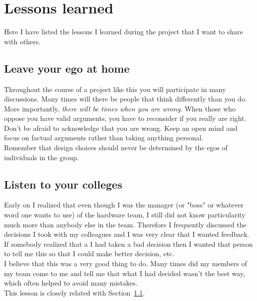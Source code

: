 
\section{Lessons learned}\label{sec:lessons}
Here I have listed the lessons I learned during the project that I want to share with others.

\subsection{Leave your ego at home}\label{sec:ego}
Throughout the course of a project like this you will participate in many discussions. Many times will there be people that think differently than you do. More importantly, \emph{there will be times when you are wrong}. When those who oppose you have valid arguments, you have to reconsider if you really are right. \\
Don't be afraid to acknowledge that you are wrong. Keep an open mind and focus on factual arguments rather than taking anything personal. \\
Remember that design choices should never be determined by the egos of individuals in the group.


\subsection{Listen to your colleges}\label{sec:listen}
Early on I realized that even though I was the manager (or "boss" or whatever word one wants to use) of the hardware team, I still did not know particularity much more than anybody else in the team. Therefore I frequently discussed the decisions I took with my colleagues and I was very clear that I wanted feedback. If somebody realized that a I had taken a bad decision then I wanted that person to tell me this so that I could make better decision, etc. \\
I believe that this was a very good thing to do. Many times did my members of my team come to me and tell me that what I had decided wasn't the best way, which often helped to avoid many mistakes. \\
This lesson is closely related with Section~\ref{sec:ego}.


